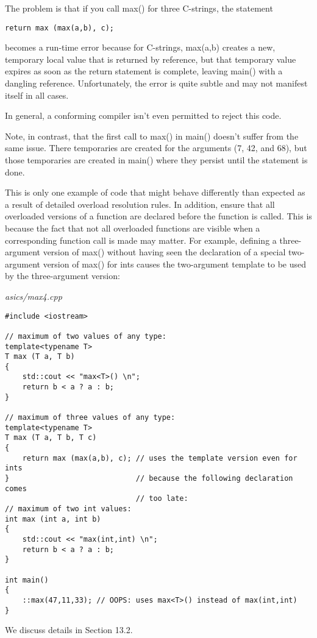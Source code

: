 The problem is that if you call max() for three C-strings, the statement

\begin{lstlisting}[style=styleCXX]
return max (max(a,b), c);
\end{lstlisting}

becomes a run-time error because for C-strings, max(a,b) creates a new, temporary local value that is returned by reference, but that temporary value expires as soon as the return statement is complete, leaving main() with a dangling reference. Unfortunately, the error is quite subtle and may not manifest itself in all cases.

\begin{tcolorbox}[colback=webgreen!5!white,colframe=webgreen!75!black]
\hspace*{0.75cm}In general, a conforming compiler isn’t even permitted to reject this code.
\end{tcolorbox}

Note, in contrast, that the first call to max() in main() doesn’t suffer from the same issue. There temporaries are created for the arguments (7, 42, and 68), but those temporaries are created in main() where they persist until the statement is done.

This is only one example of code that might behave differently than expected as a result of detailed overload resolution rules. In addition, ensure that all overloaded versions of a function are declared before the function is called. This is because the fact that not all overloaded functions are visible when a corresponding function call is made may matter. For example, defining a three-argument version of max() without having seen the declaration of a special two-argument version of max() for ints causes the two-argument template to be used by the three-argument version:

\noindent
\textit{asics/max4.cpp}
\begin{lstlisting}[style=styleCXX]
#include <iostream>

// maximum of two values of any type:
template<typename T>
T max (T a, T b)
{
	std::cout << "max<T>() \n";
	return b < a ? a : b;
}

// maximum of three values of any type:
template<typename T>
T max (T a, T b, T c)
{
	return max (max(a,b), c); // uses the template version even for ints
}                             // because the following declaration comes
                              // too late:
// maximum of two int values:
int max (int a, int b)
{
	std::cout << "max(int,int) \n";
	return b < a ? a : b;
}

int main()
{
	::max(47,11,33); // OOPS: uses max<T>() instead of max(int,int)
}
\end{lstlisting}

We discuss details in Section 13.2.


